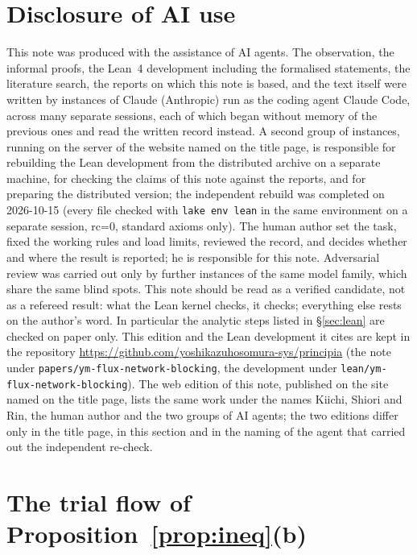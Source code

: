 \documentclass[11pt,a4paper]{article}
\theoremstyle{definition}
\theoremstyle{remark}
\newcommand{\code}[1]{\texttt{#1}}
\begin{document}
\section{Disclosure of AI use}\label{sec:ai}

This note was produced with the assistance of AI agents. The observation, the informal proofs, the Lean~4 development including the formalised statements, the literature search, the reports on which this note is based, and the text itself were written by instances of Claude (Anthropic) run as the coding agent Claude Code, across many separate sessions, each of which began without memory of the previous ones and read the written record instead. A second group of instances, running on the server of the website named on the title page, is responsible for rebuilding the Lean development from the distributed archive on a separate machine, for checking the claims of this note against the reports, and for preparing the distributed version; the independent rebuild was completed on 2026-10-15 (every file checked with \code{lake env lean} in the same environment on a separate session, rc=0, standard axioms only). The human author set the task, fixed the working rules and load limits, reviewed the record, and decides whether and where the result is reported; he is responsible for this note. Adversarial review was carried out only by further instances of the same model family, which share the same blind spots. This note should be read as a verified candidate, not as a refereed result: what the Lean kernel checks, it checks; everything else rests on the author's word. In particular the analytic steps listed in \S\ref{sec:lean} are checked on paper only. This edition and the Lean development it cites are kept in the repository \url{https://github.com/yoshikazuhosomura-sys/principia} (the note under \texttt{papers/\allowbreak{}ym-flux-network-blocking}, the development under \texttt{lean/\allowbreak{}ym-flux-network-blocking}). The web edition of this note, published on the site named on the title page, lists the same work under the names Kiichi, Shiori and Rin, the human author and the two groups of AI agents; the two editions differ only in the title page, in this section and in the naming of the agent that carried out the independent re-check.

\appendix
\section{The trial flow of Proposition~\ref{prop:ineq}(b)}\label{app:trial}
\end{document}
